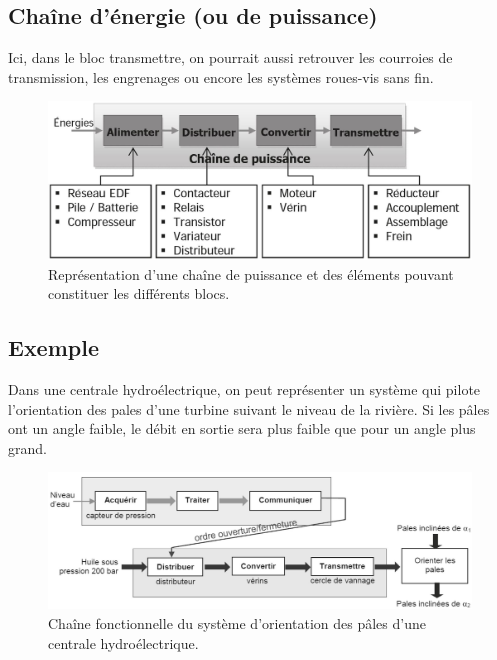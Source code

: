 \documentclass[
	11pt, %
	fleqn, %
	a4paper, %
]{LegrandOrangeBook}
\begin{document}
\subsection{Chaîne d'énergie (ou de puissance)}
Ici, dans le bloc transmettre, on pourrait aussi retrouver les courroies de transmission, les engrenages ou encore les systèmes roues-vis sans fin.
\begin{figure}[H] %
	\centering %
	\includegraphics[width=1\textwidth]{Images/chaine3.JPG} %
	\caption{Représentation d'une chaîne de puissance et des éléments pouvant constituer les différents blocs.}
	\label{chaine3} %
\end{figure}

\subsection*{Exemple}
Dans une centrale hydroélectrique, on peut représenter un système qui pilote l’orientation des pales d'une turbine suivant le niveau de la rivière. Si les pâles ont un angle faible, le débit en sortie sera plus faible que pour un angle plus grand.
\begin{figure}[H] %
	\centering %
	\includegraphics[width=1\textwidth]{Images/chaine4.JPG} %
	\caption{Chaîne fonctionnelle du système d'orientation des pâles d'une centrale hydroélectrique.}
	\label{chaine4} %
\end{figure}
\end{document}
